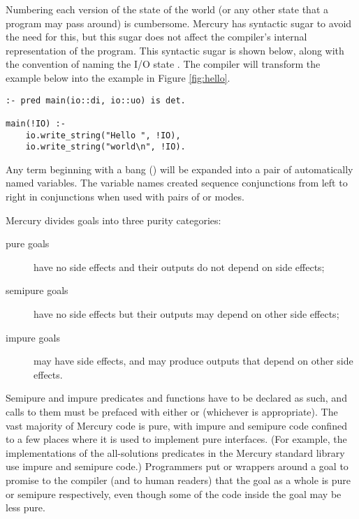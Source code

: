 Numbering each version of the state of the world
(or any other state that a program may pass around) is cumbersome.
Mercury has syntactic sugar to avoid the need for this,
but this sugar does not affect
the compiler's internal representation of the program.
This syntactic sugar is shown below, along with the convention of naming
the I/O state .
The compiler will transform the example below into the example in Figure
\ref{fig:hello}.

\begin{verbatim}
:- pred main(io::di, io::uo) is det.

main(!IO) :-
    io.write_string("Hello ", !IO),
    io.write_string("world\n", !IO).
\end{verbatim}

\noindent
Any term beginning with a bang (\code{!})
will be expanded into a pair of automatically named
variables.
The variable names created sequence conjunctions from left to right in
conjunctions when used with pairs of  or 
modes.

\label{page:purity}
Mercury divides goals into three purity categories:

\begin{description}

    \item[pure goals] have no side effects
    and their outputs do not depend on side effects;

    \item[semipure goals] have no side effects
    but their outputs may depend on other side effects;

    \item[impure goals] may have side effects, and may produce outputs
      that depend on other side effects.

\end{description}

\noindent
Semipure and impure predicates and functions
have to be declared as such,
and calls to them must be prefaced with either
 or  (whichever is appropriate).
The vast majority of Mercury code is pure,
with impure and semipure code confined to a few places
where it is used to implement pure interfaces.
(For example, the implementations of the all-solutions predicates
in the Mercury standard library use impure and semipure code.)
Programmers put
 or  wrappers around a goal
to promise to the compiler (and to human readers) that
the goal as a whole is pure or semipure respectively,
even though some of the code inside the goal may be less pure.

